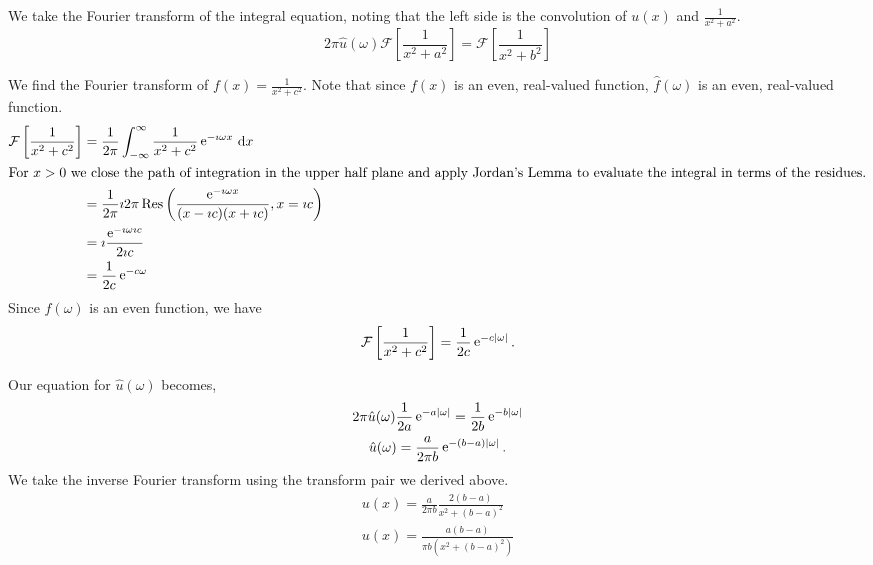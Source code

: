 {%
\begin{Solution}
  \label{solution ode ft int eqn int=1/(x2+b2)}
  We take the Fourier transform of the integral equation, noting that
  the left side is the convolution of $u(x)$ and $\frac{1}{x^2 + a^2}$.
  \[
  2 \pi \hat{u}(\omega) \mathcal{F} \left[ \frac{1}{x^2 + a^2} \right]
  = \mathcal{F} \left[ \frac{1}{x^2 + b^2} \right]
  \]

  We find the Fourier transform of $f(x) = \frac{1}{x^2 + c^2}$.
  Note that since $f(x)$ is an even, real-valued function, $\hat{f}(\omega)$
  is an even, real-valued function.
  \begin{align*}
    \mathcal{F} \left[ \frac{1}{x^2 + c^2} \right]
    &= \frac{1}{2\pi} \int_{-\infty}^\infty \frac{1}{x^2 + c^2} \mathop{\mathrm{e}}\nolimits^{-\imath \omega x} \,\mathrm{d} x \\
    \intertext{For $x > 0$ we close the path of integration in the upper half 
      plane and apply Jordan's Lemma to evaluate the integral in terms 
      of the residues.}
    &= \frac{1}{2\pi} \imath 2 \pi \mathop{\mathrm{Res}}\nolimits \left( \frac{\mathop{\mathrm{e}}\nolimits^{-\imath \omega x}}
      {(x - \imath c)(x + \imath c)}, x = \imath c \right) \\
    &= \imath \frac{ \mathop{\mathrm{e}}\nolimits^{-\imath \omega \imath c } }{ 2 \imath c } \\
    &= \frac{1}{2 c} \mathop{\mathrm{e}}\nolimits^{- c \omega }
  \end{align*}
  Since $\hat{f}(\omega)$ is an even function, we have
  \[
  \mathcal{F} \left[ \frac{1}{x^2 + c^2} \right]
  = \frac{1}{2 c} \mathop{\mathrm{e}}\nolimits^{- c |\omega| }.
  \]

  Our equation for $\hat{u}(\omega)$ becomes,
  \begin{gather*}
    2 \pi \hat{u}(\omega) \frac{1}{2 a} \mathop{\mathrm{e}}\nolimits^{-a |\omega| }
    = \frac{1}{2 b} \mathop{\mathrm{e}}\nolimits^{-b |\omega|} \\
    \hat{u}(\omega) = \frac{ a }{ 2 \pi b } \mathop{\mathrm{e}}\nolimits^{- (b-a) |\omega| }.
  \end{gather*}
  We take the inverse Fourier transform using the transform pair we derived
  above.
  \begin{gather*}
    u(x) = \frac{ a }{ 2 \pi b } \frac{ 2 (b-a) }{ x^2 + (b-a)^2 } \\
    \boxed{
      u(x) = \frac{ a (b-a) }{ \pi b ( x^2 + (b-a)^2 ) } 
      }
  \end{gather*}
\end{Solution}







\raggedbottom
}
